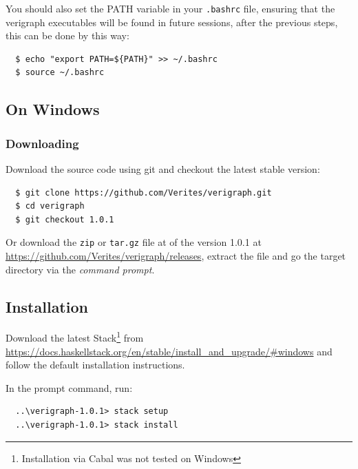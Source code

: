 \documentclass[12pt]{article}
\begin{document}
You should also set the PATH variable in your \texttt{.bashrc} file, ensuring that the verigraph executables will be found in future sessions, after the previous steps, this can be done by this way:

\begin{verbatim}
  $ echo "export PATH=${PATH}" >> ~/.bashrc
  $ source ~/.bashrc
\end{verbatim}

\subsection{On Windows}

\subsubsection{Downloading}
Download the source code using git and checkout the latest stable version:
\begin{verbatim}
  $ git clone https://github.com/Verites/verigraph.git
  $ cd verigraph
  $ git checkout 1.0.1
\end{verbatim}

\noindent
Or download the \texttt{zip} or \texttt{tar.gz} file at of the version 1.0.1 at \url{https://github.com/Verites/verigraph/releases}, extract the file and go the target directory via the \emph{command prompt}.

\subsection{Installation}

Download the latest Stack\footnote{Installation via Cabal was not tested on Windows} from \url{https://docs.haskellstack.org/en/stable/install_and_upgrade/#windows} and follow the default installation instructions.

In the prompt command, run:

\begin{verbatim}
  ..\verigraph-1.0.1> stack setup 
  ..\verigraph-1.0.1> stack install
\end{verbatim}


\end{document}
